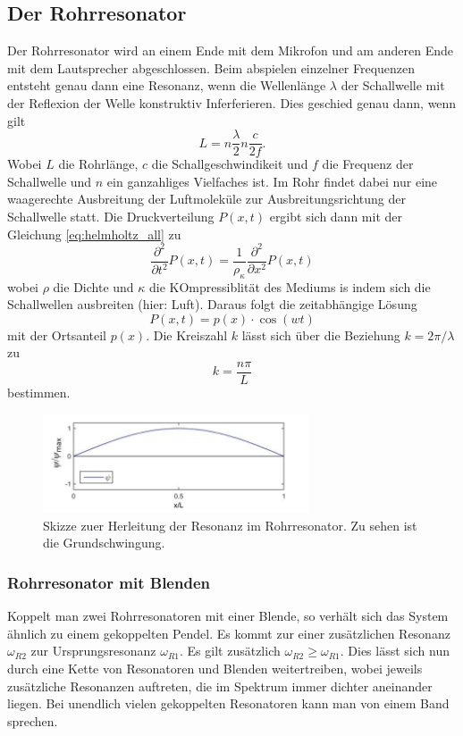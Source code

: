 \subsection{Der Rohrresonator}
Der Rohrresonator wird an einem Ende mit dem Mikrofon und am anderen Ende mit dem Lautsprecher abgeschlossen.
Beim abspielen einzelner Frequenzen entsteht genau dann eine Resonanz, wenn die Wellenlänge $\lambda$ der Schallwelle
mit der Reflexion der Welle konstruktiv Inferferieren. Dies geschied genau dann, wenn gilt
\begin{equation}
    L=n\frac{\lambda}{2}n\frac{c}{2f}.
\end{equation}
Wobei $L$ die Rohrlänge, $c$ die Schallgeschwindikeit und $f$ die Frequenz der Schallwelle und $n$ ein ganzahliges Vielfaches ist.
Im Rohr findet dabei nur eine waagerechte Ausbreitung der Luftmoleküle zur Ausbreitungsrichtung der Schallwelle statt.
Die Druckverteilung $P(x,t)$ ergibt sich dann mit der Gleichung \ref{eq:helmholtz_all} zu
\begin{equation}
    \frac{\partial^2}{\partial t^2}P(x,t)=\frac{1}{\rho_\kappa}\frac{\partial^2}{\partial x^2}P(x,t)
\end{equation}
\label{sec:Theorie}
wobei $\rho$ die Dichte und $\kappa$ die KOmpressiblität des Mediums is indem sich die Schallwellen ausbreiten (hier: Luft).
Daraus folgt die zeitabhängige Lösung
\begin{equation}
    P(x,t)=p(x)\cdot \cos{(wt)}
    \label{eq:rohr_loe}
\end{equation}
mit der Ortsanteil $p(x)$.
Die Kreiszahl $k$ lässt sich über die Beziehung $k=2\pi/\lambda$ zu
\begin{equation}
    k=\frac{n\pi}{L}
\end{equation}
bestimmen.

\begin{figure}
    \center
    \includegraphics[width=0.7\textwidth]{bilder/Resonanz.jpg}
    \caption{Skizze zuer Herleitung der Resonanz im Rohrresonator. Zu sehen ist die Grundschwingung. \cite{uni}}
\end{figure}

\subsubsection{Rohrresonator mit Blenden}
Koppelt man zwei Rohrresonatoren mit einer Blende, so verhält sich das System ähnlich zu einem 
gekoppelten Pendel. Es kommt zur einer zusätzlichen Resonanz $\omega_{R2}$ zur Ursprungsresonanz $\omega_{R1}$.
Es gilt zusätzlich $\omega_{R2}\geq \omega_{R1}$. Dies lässt sich nun durch eine Kette von Resonatoren und Blenden weitertreiben, wobei
jeweils zusätzliche Resonanzen auftreten, die im Spektrum immer dichter aneinander liegen.
Bei unendlich vielen gekoppelten Resonatoren kann man von einem Band sprechen.

